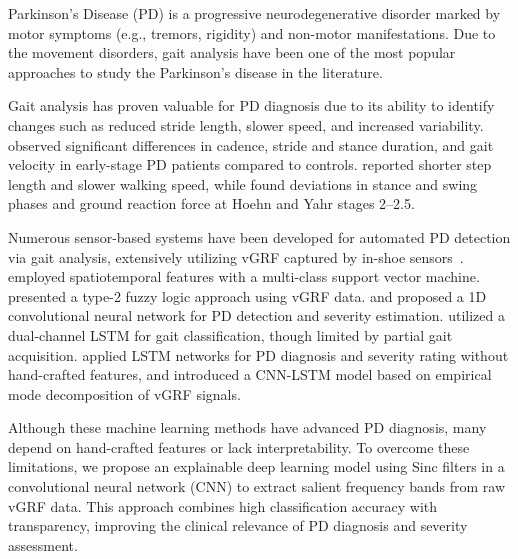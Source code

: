 Parkinson's Disease (PD) is a progressive neurodegenerative disorder marked by motor symptoms (e.g., tremors, rigidity) and non-motor manifestations. Due to the movement disorders, gait analysis have been one of the most popular approaches to study the Parkinson's disease in the literature. 

Gait analysis has proven valuable for PD diagnosis due to its ability to identify changes such as reduced stride length, slower speed, and increased variability. \cite{pistacchi2017gait} observed significant differences in cadence, stride and stance duration, and gait velocity in early-stage PD patients compared to controls. \cite{SOFUWA20051007} reported shorter step length and slower walking speed, while \cite{lescano2016possible} found deviations in stance and swing phases and ground reaction force at Hoehn and Yahr stages 2--2.5.


Numerous sensor-based systems have been developed for automated PD detection via gait analysis, extensively utilizing vGRF captured by in-shoe sensors~\citep{deep1d,LSTM,SalimiBadr-MultiLSTM,Applied_Soft_SVM,Applied_Soft_severity,cnnlstm,Liu2021CNN_and_LSTM}.\cite{Applied_Soft_SVM} employed spatiotemporal features with a multi-class support vector machine. \cite{neuro-fuzzy} presented a type-2 fuzzy logic approach using vGRF data. and \cite{deep1d} proposed a 1D convolutional neural network for PD detection and severity estimation. \cite{ZHAO201891} utilized a dual-channel LSTM for gait classification, though limited by partial gait acquisition. \cite{LSTM} applied LSTM networks for PD diagnosis and severity rating without hand-crafted features, and \cite{BVIDYA2022105099} introduced a CNN-LSTM model based on empirical mode decomposition of vGRF signals.

Although these machine learning methods have advanced PD diagnosis, many depend on hand-crafted features or lack interpretability.
 To overcome these limitations, we propose an explainable deep learning model using Sinc filters in a convolutional neural network (CNN) to extract salient frequency bands from raw vGRF data. This approach combines high classification accuracy with transparency, improving the clinical relevance of PD diagnosis and severity assessment.




